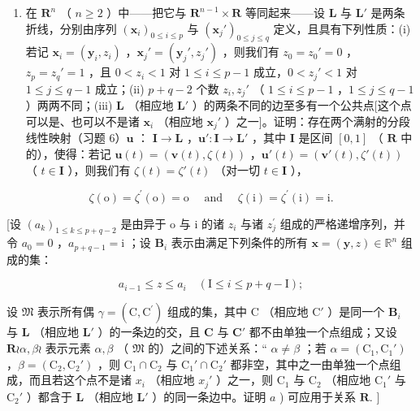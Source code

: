 \begin{enumerate}
\def\labelenumi{\alph{enumi})}
\setcounter{enumi}{1}
\tightlist
\item
  在 \(\mathbf{R}^n\) （ \(n \geqslant 2\) ）中——把它与 \(\mathbf{R}^{n-1} \times \mathbf{R}\) 等同起来——设 \(\mathbf{L}\) 与 \(\mathbf{L}'\) 是两条折线，分别由序列 \((\boldsymbol{x}_i)_{0 \leqslant i \leqslant p}\) 与 \((\boldsymbol{x}_j')_{0 \leqslant j \leqslant q}\) 定义，且具有下列性质：(i) 若记 \(\boldsymbol{x}_i = (\boldsymbol{y}_i, z_i)\) ，\(\boldsymbol{x}_j' = (\boldsymbol{y}_j', z_j')\) ，则我们有 \(z_0 = z_0' = 0\) ，\(z_p = z_q' = 1\) ，且 \(0 < z_i < 1\) 对 \(1 \leqslant i \leqslant p - 1\) 成立，\(0 < z_j' < 1\) 对 \(1 \leqslant j \leqslant q - 1\) 成立；(ii) \(p + q - 2\) 个数 \(z_i, z_j'\) （ \(1 \leqslant i \leqslant p - 1\) ，\(1 \leqslant j \leqslant q - 1\) ）两两不同；(iii) \(\mathbf{L}\) （相应地 \(\mathbf{L}'\) ）的两条不同的边至多有一个公共点{[}这个点可以是、也可以不是诸 \(\boldsymbol{x}_i\) （相应地 \(\boldsymbol{x}_j'\) ）之一{]}。证明：存在两个满射的分段线性映射（习题 6）\(\boldsymbol{u}\) ： \(\mathbf{I} \to \mathbf{L}\) ，\(\boldsymbol{u}'\colon \mathbf{I} \to \mathbf{L}'\) ，其中 \(\mathbf{I}\) 是区间 \([0, 1]\) （ \(\mathbf{R}\) 中的），使得：若记 \(\boldsymbol{u}(t) = (\boldsymbol{v}(t), \zeta(t))\) ，\(\boldsymbol{u}'(t) = (\boldsymbol{v}'(t), \zeta'(t))\) （ \(t \in \mathbf{I}\) ），则我们有 \(\zeta(t) = \zeta'(t)\) （对一切 \(t \in \mathbf{I}\) ），
\end{enumerate}

\[
\zeta (\mathrm{o}) = \zeta^ {\prime} (\mathrm{o}) = \mathrm{o} \quad \text { and } \quad \zeta (\mathrm{i}) = \zeta^ {\prime} (\mathrm{i}) = \mathrm{i}.
\]

{[}设 \((a_{k})_{1\leqslant k\leqslant p + q - 2}\) 是由异于 o 与 i 的诸 \(z_{i}\) 与诸 \(z_j^{\prime}\) 组成的严格递增序列，并令 \(a_0 = 0\) ，\(a_{p + q - 1} = \mathrm{i}\) ；设 \(\mathbf{B}_i\) 表示由满足下列条件的所有 \(\pmb {x} = (\pmb {y},z)\in \mathbb{R}^n\) 组成的集：

\[
a _ {i - 1} \leqslant z \leqslant a _ {i} \quad (\mathrm{I} \leqslant i \leqslant p + q - \mathrm{I});
\]

设 \(\mathfrak{M}\) 表示所有偶 \(\gamma = (\mathrm{C},\mathrm{C}^{\prime})\) 组成的集，其中 \(\mathrm{C}\) （相应地 \(\mathrm{C}'\) ）是同一个 \(\mathbf{B}_i\) 与 \(\mathbf{L}\) （相应地 \(\mathbf{L}'\) ）的一条边的交，且 \(\mathbf{C}\) 与 \(\mathbf{C}'\) 都不由单独一个点组成；又设 \(\mathbf{R}\wr \alpha, \beta\wr\) 表示元素 \(\alpha, \beta\) （ \(\mathfrak{M}\) 的）之间的下述关系：“ \(\alpha \neq \beta\) ；若 \(\alpha = (\mathrm{C}_1,\mathrm{C}_1')\) ，\(\beta = (\mathrm{C}_2,\mathrm{C}_2')\) ，则 \(\mathrm{C}_1 \cap \mathrm{C}_2\) 与 \(\mathrm{C}_1' \cap \mathrm{C}_2'\) 都非空，其中之一由单独一个点组成，而且若这个点不是诸 \(x_i\) （相应地 \(x_j'\) ）之一，则 \(\mathrm{C}_1\) 与 \(\mathrm{C}_2\) （相应地 \(\mathrm{C}_1'\) 与 \(\mathrm{C}_2'\) ）都含于 \(\mathbf{L}\) （相应地 \(\mathbf{L}'\) ）的同一条边中。证明 \(a\) ) 可应用于关系 \(\mathbf{R}.\) {]}

